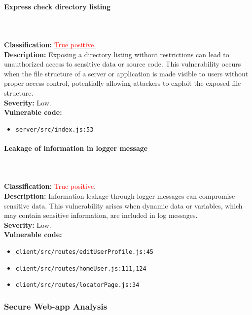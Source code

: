\documentclass[]{article}
\begin{document}
\paragraph{Express check directory listing} \mbox{} \\ \\
\textbf{Classification:} \hyperref[subsubsec:exposure_of_information_through_directory_listing]{\textcolor{red}{True} \textcolor{red}{positive}.} \\
\textbf{Description:} Exposing a directory listing without restrictions can lead to unauthorized access to sensitive data or source code. This vulnerability occurs when the file structure of a server or application is made visible to users without proper access control, potentially allowing attackers to exploit the exposed file structure. \\ 
\textbf{Severity:} Low. \\ 
\textbf{Vulnerable code:}
\begin{itemize}
    \item \texttt{server/src/index.js:53}
\end{itemize}

\paragraph{Leakage of information in logger message} \mbox{} \\ \\
\textbf{Classification:} \textcolor{red}{True} \textcolor{red}{positive}. \\
\textbf{Description:} Information leakage through logger messages can compromise sensitive data. This vulnerability arises when dynamic data or variables, which may contain sensitive information, are included in log messages. \\ 
\textbf{Severity:} Low. \\ 
\textbf{Vulnerable code:}
\begin{itemize}
    \item \texttt{client/src/routes/editUserProfile.js:45}
    \item \texttt{client/src/routes/homeUser.js:111,124}
    \item \texttt{client/src/routes/locatorPage.js:34}
\end{itemize}

\subsubsection{Secure Web-app Analysis}
\end{document}
